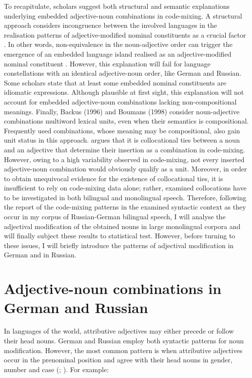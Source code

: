 To recapitulate, scholars suggest both structural and semantic explanations underlying embedded adjective-noun combinations in code-mixing. A structural approach considers incongruence between the involved languages in the realisation patterns of adjective-modified nominal constituents as a crucial factor \citep{myers-scotton-matching-1995, myers-scotton-contact-2002}. In other words, non-equivalence in the noun-adjective order can trigger the emergence of an embedded language island realised as an adjective-modified nominal constituent \citep{deuchar-congruence-2005}. However, this explanation will fail for language constellations with an identical adjective-noun order, like German and Russian. Some scholars \citep[e.g.,][]{poplack-meechan-1995} state that at least some embedded nominal constituents are idiomatic expressions. Although plausible at first sight, this explanation will not account for embedded adjective-noun combinations lacking non-compositional meanings. Finally, Backus (1996) and Boumans (1998) consider noun-adjective combinations multiword lexical units, even when their semantics is compositional. Frequently used combinations, whose meaning may be compositional, also gain unit status in this approach. \citet{boumans-syntax-1998} argues that it is collocational ties between a noun and an adjective that determine their insertion as a combination in code-mixing.  However, owing to a high variability observed in code-mixing, not every inserted adjective-noun combination would obviously qualify as a unit. Moreover, in order to obtain unequivocal evidence for the existence of collocational ties, it is insufficient to rely on code-mixing data alone; rather, examined collocations have to be investigated in both bilingual and monolingual speech. Therefore, following the report of the code-mixing patterns in the examined syntactic context as they occur in my corpus of Russian-German bilingual speech, I will analyse the adjectival modification of the obtained nouns in large monolingual corpora and will finally subject these results to statistical test. However, before turning to these issues, I will briefly introduce the patterns of adjectival modification in German and in Russian.

\section{Adjective-noun combinations in German and Russian}
In languages of the world, attributive adjectives may either precede or follow their head nouns. German and Russian employ both syntactic patterns for noun modification. However, the most common pattern is when attributive adjectives occur in the prenominal position and agree with their head nouns in gender, number and case (\citealt[1303]{rusgramm-tom1}; \citealt[232]{eisenberg-satz-1999}). For example:

